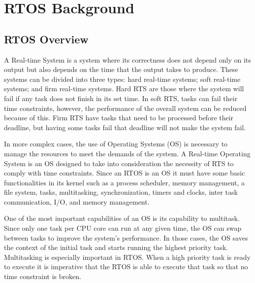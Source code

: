 \chapter{RTOS Background}
\label{chapter:RTOS}
\section{RTOS Overview}
A Real-time System is a system where its correctness does not depend only on its output but also depends on the time that the output takes to produce. These systems can be divided into three types: hard real-time systems; soft real-time systems; and firm real-time systems. Hard RTS are those where the system will fail if any task does not finish in its set time. In soft RTS, tasks can fail their time constraints, however, the performance of the overall system can be reduced because of this. Firm RTS have tasks that need to be processed before their deadline, but having some tasks fail that deadline will not make the system fail.

In more complex cases, the use of Operating Systems (OS) is necessary to manage the resources to meet the demands of the system. A Real-time Operating System is an OS designed to take into consideration the necessity of RTS to comply with time constraints. Since an RTOS is an OS it must have some basic functionalities in its kernel such as a process scheduler, memory management, a file system, tasks, multitasking, synchronization, timers and clocks, inter task communication, I/O, and memory management. 

One of the most important capabilities of an OS is its capability to multitask. Since only one task per CPU core can run at any given time, the OS can swap between tasks to improve the system's performance. In those cases, the OS saves the context of the initial task and starts running the highest priority task. Multitasking is especially important in RTOS. When a high priority task is ready to execute it is imperative that the RTOS is able to execute that task so that no time constraint is broken.

